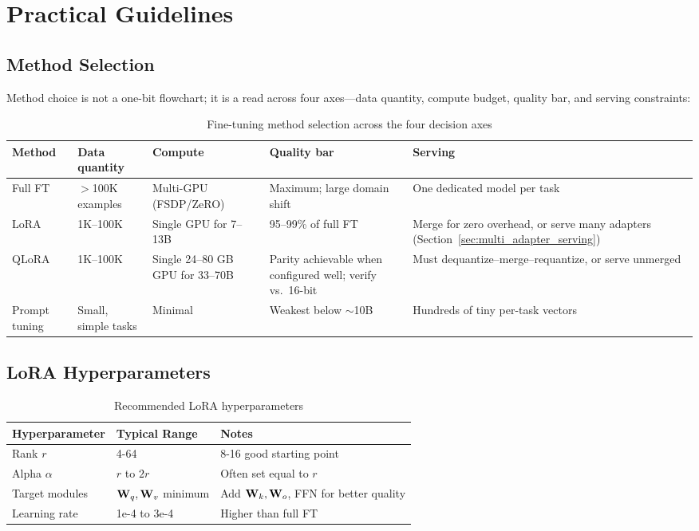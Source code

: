 \section{Practical Guidelines}
\label{sec:transfer_practical}

\subsection{Method Selection}

Method choice is not a one-bit flowchart; it is a read across four axes---data quantity, compute budget, quality bar, and serving constraints:

\begin{table}[H]
\centering
\caption{Fine-tuning method selection across the four decision axes}
\begin{tabularx}{\textwidth}{lXXXX}
\toprule
\textbf{Method} & \textbf{Data quantity} & \textbf{Compute} & \textbf{Quality bar} & \textbf{Serving} \\
\midrule
Full FT & $>$100K examples & Multi-GPU (FSDP/ZeRO) & Maximum; large domain shift & One dedicated model per task \\
LoRA & 1K--100K & Single GPU for 7--13B & 95--99\% of full FT & Merge for zero overhead, or serve many adapters (Section~\ref{sec:multi_adapter_serving}) \\
QLoRA & 1K--100K & Single 24--80 GB GPU for 33--70B & Parity achievable when configured well; verify vs.\ 16-bit & Must dequantize--merge--requantize, or serve unmerged \\
Prompt tuning & Small, simple tasks & Minimal & Weakest below $\sim$10B & Hundreds of tiny per-task vectors \\
\bottomrule
\end{tabularx}
\end{table}

\subsection{LoRA Hyperparameters}

\begin{table}[H]
\centering
\caption{Recommended LoRA hyperparameters}
\begin{tabularx}{\textwidth}{lXX}
\toprule
\textbf{Hyperparameter} & \textbf{Typical Range} & \textbf{Notes} \\
\midrule
Rank $r$ & 4-64 & 8-16 good starting point \\
Alpha $\alpha$ & $r$ to $2r$ & Often set equal to $r$ \\
Target modules & $\mathbf{W}_q, \mathbf{W}_v$ minimum & Add $\mathbf{W}_k, \mathbf{W}_o$, FFN for better quality \\
Learning rate & 1e-4 to 3e-4 & Higher than full FT \\
\bottomrule
\end{tabularx}
\end{table}

